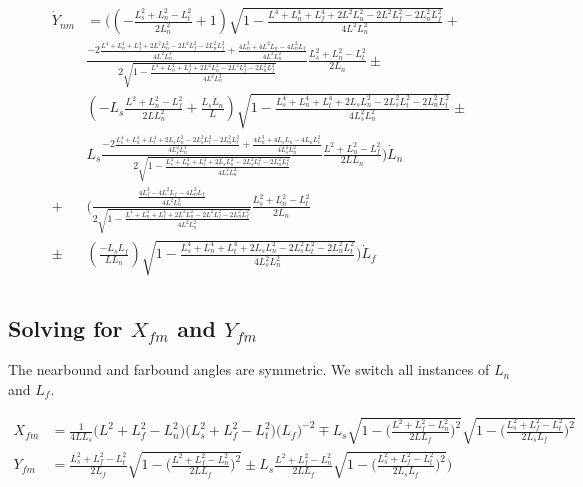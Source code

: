 \documentclass[11pt, landscape]{article}
\begin{document}
\begin{align}
    \dot{Y}_{nm} &=
    \Bigg(\left(-\frac{L_{s}^2+L_{n}^2-L_{t}^2}{2L_n^2} + 1\right)\sqrt{1-\frac{L^4 + L_n^4 + L_f^4 + 2L^2L_n^2 - 2L^2L_f^2 - 2L_n^2L_f^2}{4L^2L_n^2}} +\\
    &\frac{-2\frac{L^4 + L_n^4 + L_f^4 + 2L^2L_n^2 - 2L^2L_f^2 - 2L_n^2L_f^2}{4L^2L_n^3} + \frac{4L_n^3 + 4L^2L_n - 4L_n^2L_f}{4L^2L_n^2}}{2\sqrt{1-\frac{L^4 + L_n^4 + L_f^4 + 2L^2L_n^2 - 2L^2L_f^2 - 2L_n^2L_f^2}{4L^2L_n^2}}}\frac{L_{s}^2+L_{n}^2-L_{t}^2}{2L_{n}} \pm\\
    &\left(-L_s\frac{L^2+L_{n}^2-L_{f}^2}{2LL_{n}^2} + \frac{L_s\dot{L}_n}{L}\right)\sqrt{1-\frac{L_s^4 + L_n^4 + L_t^4 + 2L_sL_n^2 - 2L_s^2L_t^2 - 2L_n^2L_t^2}{4L_s^2L_n^2}} \pm\\
    &L_s\frac{-2\frac{L_s^4 + L_n^4 + L_t^4 + 2L_sL_n^2 - 2L_s^2L_t^2 - 2L_n^2L_t^2}{4L_s^2L_n^3} + \frac{4L_n^3 + 4L_sL_n - 4L_nL_t^2}{4L_s^2L_n^2}}{2\sqrt{1-\frac{L_s^4 + L_n^4 + L_t^4 + 2L_sL_n^2 - 2L_s^2L_t^2 - 2L_n^2L_t^2}{4L_s^2L_n^2}}}\frac{L^2+L_{n}^2-L_{f}^2}{2LL_{n}}\Bigg)\dot{L}_n\\
    + &\Bigg(\frac{\frac{4L_f^3 - 4L^2L_f - 4L_n^2L_f}{4L^2L_n^2}}{2\sqrt{1-\frac{L^4 + L_n^4 + L_f^4 + 2L^2L_n^2 - 2L^2L_f^2 - 2L_n^2L_f^2}{4L^2L_n^2}}}\frac{L_{s}^2+L_{n}^2-L_{t}^2}{2L_{n}}\\
    \pm &\left(\frac{-L_sL_{f}}{LL_{n}}\right)\sqrt{1-\frac{L_s^4 + L_n^4 + L_t^4 + 2L_sL_n^2 - 2L_s^2L_t^2 - 2L_n^2L_t^2}{4L_s^2L_n^2}}\Bigg)\dot{L}_f\\
\end{align}

\subsection{Solving for $X_{fm}$ and $Y_{fm}$}
The nearbound and farbound angles are symmetric. We switch all instances of $L_n$ and $L_f$.

\begin{align}
  X_{fm} &= \frac{1}{4LL_s}\Big(L^2+L_{f}^2-L_{n}^2\Big)\Big(L_{s}^2+L_{f}^2-L_{t}^2\Big)\big(L_f \big)^{-2} \mp L_s\sqrt{1-\bigg(\frac{L^2+L_{f}^2-L_{n}^2}{2LL_{f}}\bigg)^2}\sqrt{1-\bigg(\frac{L_{s}^2+L_{f}^2-L_{t}^2}{2L_{s}L_{f}}\bigg)^2}\\
  Y_{fm} &= \frac{L_{s}^2+L_{f}^2-L_{t}^2}{2L_{f}}\sqrt{1-\bigg(\frac{L^2+L_{f}^2-L_{n}^2}{2LL_{f}}\bigg)^2} \pm L_s\frac{L^2+L_{f}^2-L_{n}^2}{2LL_{f}}\sqrt{1-\bigg(\frac{L_{s}^2+L_{f}^2-L_{t}^2}{2L_{s}L_{f}}\bigg)^2} \Bigg)\\
\end{align}
\end{document}
